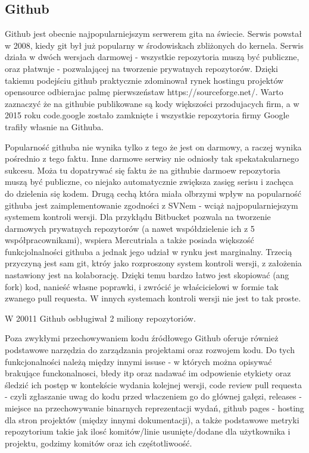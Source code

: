 \documentclass[a4paper,11pt,twoside]{report}
\theoremstyle{definition}
\begin{document}
\subsection{Github}

Github jest obecnie najpopularniejszym serwerem gita na świecie. Serwis 
powstał w 2008, kiedy git był już popularny w środowiskach zbliżonych do 
kernela. Serwis działa w dwóch wersjach darmowej - wszystkie repozytoria 
muszą być publiczne, oraz płatwnje - pozwalającej na tworzenie prywatnych 
repozytorów. Dzięki takiemu podejściu github praktycznie zdominował rynek 
hostingu projektów opensource odbierajac palmę pierwszeństaw 
https://sourceforge.net/. Warto zaznaczyć że na githubie publikowane są kody 
większości przodujacych firm, a w 2015 roku code.google zostało zamknięte i 
wszystkie repozytoria firmy Google trafiły własnie na Githuba.

Popularność githuba nie wynika tylko z tego że jest on darmowy, a raczej 
wynika pośrednio z tego faktu. Inne darmowe serwisy nie odniosły tak 
spekatakularnego sukcesu. Moża tu dopatrywać się faktu że na githubie 
darmoew repozytoria muszą być publiczne, co niejako automatycznie zwiększa 
zasięg serisu i zachęca do dzielenia się kodem. Drugą cechą która miała 
olbrzymi wpływ na popularność githuba jest zaimplementowanie zgodności z 
SVNem - wciąż najpopularniejszym systemem kontroli wersji. Dla przykłądu 
Bitbucket pozwala na tworzenie darmowych prywatnych repozytorów (a nawet 
współdzielenie ich z 5 współpracownikami), wspiera Mercutriala a także 
posiada większość funkcjolnalności githuba a jednak jego udział w rynku 
jest marginalny. Trzecią przyczyną jest sam git, ktróy jako rozproszony 
system kontroli wersji, z założenia nastawiony jest na kolaborację. Dzięki 
temu bardzo łatwo jest skopiować (ang fork) kod, nanieść własne poprawki, 
i zwrócić je właścicielowi w formie tak zwanego pull requesta. W innych 
systemach kontroli wersji nie jest to tak proste.

W 20011 Github osbługiwał 2 miliony repozytoriów.

Poza zwykłymi przechowywaniem kodu źródłowego Github oferuje również 
podstawowe narzędzia do zarządzania projektami oraz rozwojem kodu. Do tych 
funkcjonalności należą między innymi issuse - w których można opisywać 
brakujące funckonalnosci, błedy itp oraz nadawać im odpowienie etykiety oraz 
śledzić ich postęp w kontekście wydania kolejnej wersji, code review pull 
requesta - czyli zgłaszanie uwag do kodu przed właczeniem go do głównej 
gałęzi, releases - miejsce na przechowywanie binarnych reprezentacji wydań, 
github pages - hosting dla stron projektów (między innymi dokumentacji), a 
także podstawowe metryki repozytorium takie jak ilosć komitów/linie 
usunięte/dodane dla użytkownika i projektu, godzimy komitów oraz ich 
częśtotliwoość.
\end{document}
